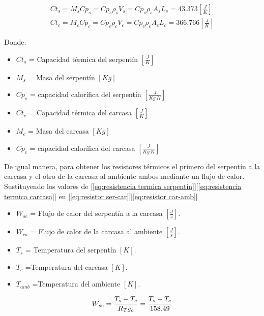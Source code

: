 \documentclass[12pt,letterpaper]{article}     %
\begin{document}
\begin{align} 
Ct_{s} = M_{s}Cp_{s} = Cp_{s} \rho_{s}V_{s} = Cp_{s} \rho_{s}A_{s}L_{s} = 43.373[\frac{J}{K}] \label{eq:captermserpentin}\\ 
Ct_{c} = M_{c}Cp_{c} = Cp_{c} \rho_{c}V_{c} = Cp_{c} \rho_{c}A_{c}L_{c} = 366.766 [\frac{J}{K}] \label{eq:capatermicarcasa}
\end{align}

Donde:

\begin{itemize}
    \item $Ct_{s}$ = Capacidad térmica del serpentín $[\frac{J}{K}]$ 
    \item $M_{s}$ = Masa del serpentín $[Kg]$
    \item $Cp_{s}$ = capacidad calorífica del  serpentín $[\frac{J}{Kg\ K}]$
    \item $Ct_{c}$ = Capacidad térmica del carcasa $[\frac{J}{K}]$
    \item $M_{c}$ = Masa del carcasa $[Kg]$
    \item $Cp_{c}$ = capacidad calorífica del carcasa $[\frac{J}{Kg\ K}]$
    
\end{itemize}

De igual manera, para obtener los resistores térmicos el primero del serpentín a la carcasa y el otro de la carcasa al ambiente ambos mediante un flujo de calor. Sustituyendo los valores de [\ref{eq:resistencia termica serpentin}][\ref{eq:resistencia termica carcasa}] en [\ref{eq:resistor ser-car}][\ref{eq:resistor car-amb}]

\begin{itemize}
    \item $W_{sc}$ = Flujo de calor del serpentín a la carcasa $[\frac{J}{s}]$.
    \item $W_{ca}$ = Flujo de calor de la carcasa al ambiente $[\frac{J}{s}]$.
    \item $T_{s}$ = Temperatura del serpentín $[K]$.
    \item $T_{c}$ =Temperatura del carcasa $[K]$.
    \item $T_{amb}$ =Temperatura del ambiente $[K]$.
\end{itemize}

\begin{equation}
W_{sc} = \frac{T_{s} - T_{c}}{R_{TSc}} = \frac{T_{s} - T_{c}}{158.49} \label{eq:resistor ser-car}\\ 
\end{equation} 
\end{document}
